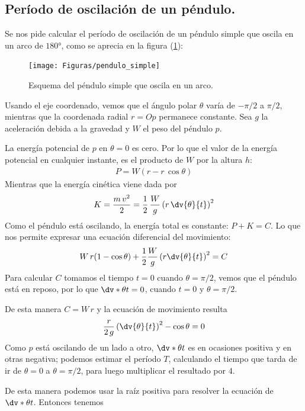 \subsection{Período de oscilación de un péndulo.}
Se nos pide calcular el período de oscilación de un péndulo simple que oscila en un arco de $\ang{180}$, como se aprecia en la figura (\ref{fig:figura_pendulo_simple}):
\begin{figure}[H]
    \centering
    \texttt{[image: Figuras/pendulo\_simple]}
    \caption{Esquema del péndulo simple que oscila en un arco.}
    \label{fig:figura_pendulo_simple}
\end{figure}
Usando el eje coordenado, vemos que el ángulo polar $\theta$ varía de $-\pi/2$ a $\pi/2$, mientras que la coordenada radial $r = Op$ permanece constante. Sea $g$ la aceleración debida a la gravedad y $W$ el peso del péndulo $p$.
\par
La energía potencial de $p$ en $\theta = 0$ es cero. Por lo que el valor de la energía potencial en cualquier instante, es el producto de $W$ por la altura $h$:
\begin{align*}
P = W (r - r \, \cos \theta)
\end{align*}
Mientras que la energía cinética viene dada por
\begin{align*}
K = \dfrac{m \, v^{2}}{2} = \dfrac{1}{2} \, \dfrac{W}{g} \left( r \, \dv{\theta}{t} \right)^{2}
\end{align*}
Como el péndulo está oscilando, la energía total es constante: $P + K = C$. Lo que nos permite expresar una ecuación diferencial del movimiento:
\begin{align*}
W \, r (1 - \cos \theta) + \dfrac{1}{2} \dfrac{W}{g} \left( r \dv{\theta}{t} \right)^{2} = C
\end{align*}
Para calcular $C$ tomamos el tiempo $t = 0$ cuando $\theta = \pi/2$, vemos que el péndulo está en reposo, por lo que $\dv*{\theta}{t} = 0$, cuando $t = 0$ y $\theta = \pi/2$.
\par
De esta manera $C = W \, r$ y la ecuación de movimiento resulta
\begin{align*}
\dfrac{r}{2 \, g} \left( \dv{\theta}{t} \right)^{2} - \cos \theta = 0
\end{align*}
Como $p$ está oscilando de un lado a otro, $\dv*{\theta}{t}$ es en ocasiones positiva y en otras negativa; podemos estimar el período $T$, calculando el tiempo que tarda de ir de $\theta=0$ a $\theta=\pi/2$, para luego multiplicar el resultado por $4$.
\par
De esta manera podemos usar la raíz positiva para resolver la ecuación de $\dv*{\theta}{t}$. Entonces tenemos
